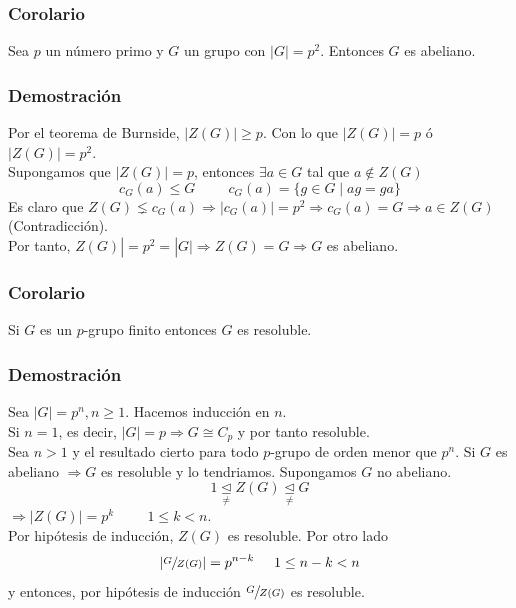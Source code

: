 \documentclass[11pt,a4paper]{article}
\begin{document}
\subsubsection*{Corolario}

Sea $p$ un número primo y $G$ un grupo con $|G| = p^{2}$. Entonces $G$ es abeliano.

\subsubsection*{Demostración}

Por el teorema de Burnside, $|Z(G)| \geq p$. Con lo que $|Z(G)| = p$ ó $|Z(G)| = p^{2}$. \\
Supongamos que $|Z(G)| = p$, entonces $\exists a \in G$ tal que $a \notin Z(G)$
$$c_{G}(a) \leqslant G \hspace{1cm} c_{G}(a) = \{g \in G \mid ag = ga\}$$
Es claro que $Z(G) \lneq c_{G}(a) \Rightarrow |c_{G}(a)| = p^{2} \Rightarrow c_{G}(a) = G \Rightarrow a \in Z(G)$ (Contradicción). \\
Por tanto, $Z(G)| = p^{2} = |G| \Rightarrow Z(G) = G \Rightarrow G$ es abeliano.

\subsubsection*{Corolario}

Si $G$ es un $p$-grupo finito entonces $G$ es resoluble.

\subsubsection*{Demostración}

Sea $|G| = p^{n}, n \geq 1$. Hacemos inducción en $n$. \\
Si $n = 1$, es decir, $|G| = p \Rightarrow G \cong C_{p}$ y por tanto resoluble. \\
Sea $n > 1$ y el resultado cierto para todo $p$-grupo de orden menor que $p^{n}$. Si $G$ es abeliano $\Rightarrow G$ es resoluble y lo tendriamos. Supongamos $G$ no abeliano.
$$1 \underset{\neq}{\unlhd} Z(G) \underset{\neq}{\unlhd} G$$
$\Rightarrow |Z(G)| = p^{k} \hspace{1cm} 1 \leq k < n$. \\
Por hipótesis de inducción, $Z(G)$ es resoluble. Por otro lado
$$|\sfrac{G}{Z(G)}| = p^{n-k} \hspace{0.5cm} 1 \leq n-k < n$$
y entonces, por hipótesis de inducción $\sfrac{G}{Z(G)}$ es resoluble.
\end{document}
